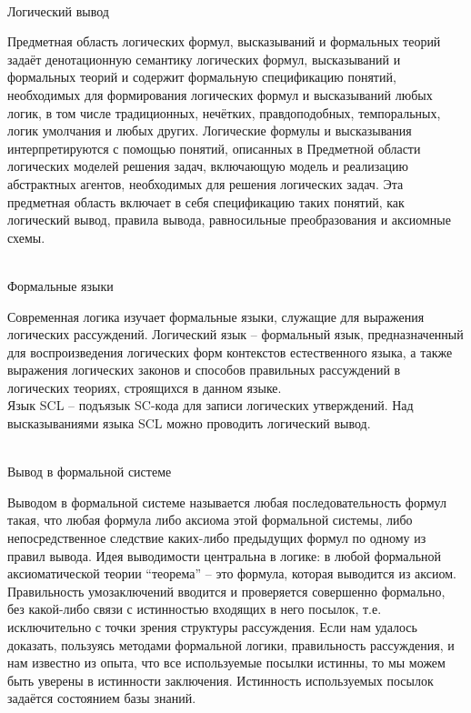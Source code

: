 \begin{frame}{\\Логический вывод}
\topline
\justifying
\vspace{10mm}

 
        Предметная область логических формул, высказываний и формальных теорий задаёт денотационную семантику логических формул, высказываний и формальных теорий и содержит формальную спецификацию понятий, необходимых для формирования логических формул и высказываний любых логик, в том числе традиционных, нечётких, правдоподобных, темпоральных, логик умолчания и любых других. Логические формулы и высказывания интерпретируются с помощью понятий, описанных в Предметной области логических моделей решения задач, включающую модель и реализацию абстрактных агентов, необходимых для решения логических задач. Эта предметная область включает в себя спецификацию таких понятий, как логический вывод, правила вывода, равносильные преобразования и аксиомные схемы.
\end{frame}

\begin{frame}{\\Формальные языки}
\topline
\justifying
\vspace{10mm}

        Современная логика изучает формальные языки, служащие для выражения логических рассуждений. Логический язык -- формальный язык, предназначенный для воспроизведения логических форм контекстов естественного языка, а также выражения логических законов и способов правильных рассуждений в логических теориях, строящихся в данном языке.
        \\Язык SCL -- подъязык SC-кода для записи логических утверждений. Над высказываниями языка SCL можно проводить логический вывод.
\end{frame}

\begin{frame}{\\Вывод в формальной системе}
\topline
\justifying
\vspace{10mm}

     
        Выводом в формальной системе называется любая последовательность формул такая, что любая формула либо аксиома этой формальной системы, либо непосредственное следствие каких-либо предыдущих формул по одному из правил вывода. Идея выводимости центральна в логике: в любой формальной аксиоматической теории ``теорема'' -- это формула, которая выводится из аксиом. Правильность умозаключений вводится и проверяется совершенно формально, без какой-либо связи с истинностью входящих в него посылок, т.е. исключительно с точки зрения структуры рассуждения. Если нам удалось доказать, пользуясь методами формальной логики, правильность рассуждения, и нам известно из опыта, что все используемые посылки истинны, то мы можем быть уверены в истинности заключения. Истинность используемых посылок задаётся состоянием базы знаний.
\end{frame}

